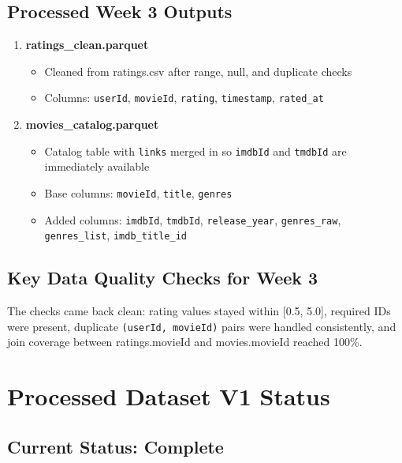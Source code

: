\documentclass[11pt]{article}
\begin{document}
\subsection{Processed Week 3 Outputs}

\begin{enumerate}[leftmargin=1.5em]
    \item \textbf{ratings\_clean.parquet}
    \begin{itemize}[leftmargin=1.5em]
        \item Cleaned from ratings.csv after range, null, and duplicate checks
        \item Columns: \texttt{userId}, \texttt{movieId}, \texttt{rating}, \texttt{timestamp}, \texttt{rated\_at}
    \end{itemize}

    \item \textbf{movies\_catalog.parquet}
    \begin{itemize}[leftmargin=1.5em]
        \item Catalog table with \texttt{links} merged in so \texttt{imdbId} and \texttt{tmdbId} are immediately available
        \item Base columns: \texttt{movieId}, \texttt{title}, \texttt{genres}
        \item Added columns: \texttt{imdbId}, \texttt{tmdbId}, \texttt{release\_year}, \texttt{genres\_raw}, \texttt{genres\_list}, \texttt{imdb\_title\_id}
    \end{itemize}
\end{enumerate}

\subsection{Key Data Quality Checks for Week 3}

The checks came back clean: rating values stayed within [0.5, 5.0], required IDs were present, duplicate \texttt{(userId, movieId)} pairs were handled consistently, and join coverage between ratings.movieId and movies.movieId reached 100\%.

\section{Processed Dataset V1 Status}

\subsection{Current Status: Complete}
\end{document}
